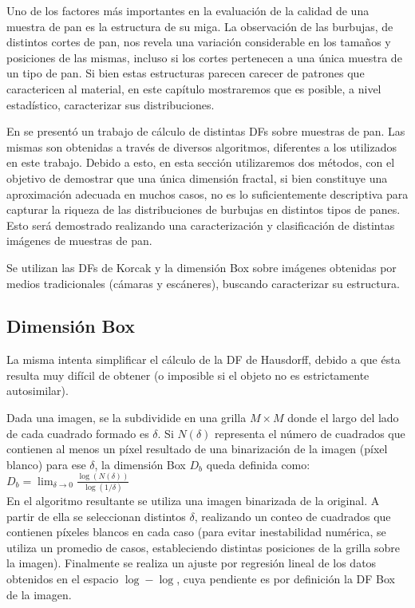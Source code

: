 Uno de los factores más importantes en la evaluación de la calidad de una muestra de pan es la estructura de su miga.
La observación de las burbujas, de distintos cortes de pan, nos revela una variación considerable en los tamaños y posiciones de las mismas, incluso si los cortes pertenecen a una única muestra de un tipo de pan.
Si bien estas estructuras parecen carecer de patrones que caractericen al material, en este capítulo mostraremos que es posible, a nivel estadístico, caracterizar sus distribuciones.

En \cite{Gonzales2008} se present\'o un trabajo de c\'alculo de distintas DFs sobre muestras de pan.
Las mismas son obtenidas a trav\'es de diversos algoritmos, diferentes a los utilizados en este trabajo.
Debido a esto, en esta sección utilizaremos dos métodos, con el objetivo de demostrar que una única dimensión fractal, si bien constituye una aproximación adecuada en muchos casos, no es lo suficientemente descriptiva para capturar la riqueza de las distribuciones de burbujas en distintos tipos de panes.
Esto será demostrado realizando una caracterización y clasificación de distintas imágenes de muestras de pan. 

Se utilizan las DFs de Korcak \cite{Mandelbrot1983} y la dimensi\'on Box \cite{Peitgen2004} sobre imágenes obtenidas por medios tradicionales (cámaras y escáneres), buscando caracterizar su estructura.


\subsection{Dimensi\'on Box}
La misma intenta simplificar el c\'alculo de la DF de Hausdorff, debido a que \'esta resulta muy dif\'icil de obtener \cite{Peitgen2004} (o imposible si el objeto no es estrictamente autosimilar).

Dada una imagen, se la subdividide en una grilla $M\times M$ donde el largo del lado de cada cuadrado formado es $\delta$. Si $N(\delta)$ representa el n\'umero de cuadrados que contienen al menos un p\'ixel resultado de una binarizaci\'on de la imagen (p\'ixel blanco) para ese $\delta$, la dimensi\'on Box $D_{b}$ queda definida como:\\

$D_{b} = \displaystyle\lim_{\delta \to 0}{\frac{\log(N(\delta))}{\log (1/\delta)}}$\\

En el algoritmo resultante se utiliza una imagen binarizada de la original. A partir de ella se seleccionan distintos $\delta$, realizando un conteo de cuadrados que contienen p\'ixeles blancos en cada caso (para evitar inestabilidad num\'erica, se utiliza un promedio de casos, estableciendo distintas posiciones de la grilla sobre la imagen). Finalmente se realiza un ajuste por regresi\'on lineal de los datos obtenidos en el espacio $\log-\log$, cuya pendiente es por definici\'on la DF Box de la imagen.

